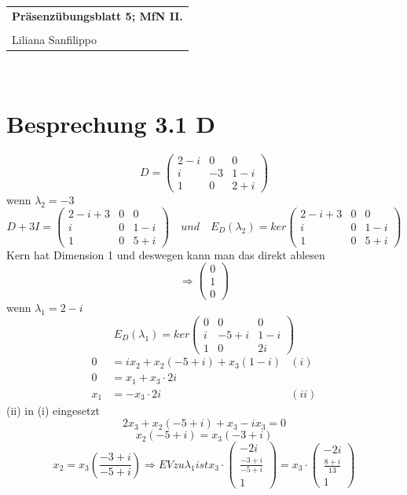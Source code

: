 \documentclass{article} %
\newcommand{\titulo}{Präsenzübungsblatt 5; MfN II.}
\newcommand{\nombre}{Liliana Sanfilippo}
\begin{document}
\begin{tabular}{p{12cm}}
{{\Large\bf\titulo}}\\
\vspace{0.2cm}\\
 {\large\nombre}\\
\end{tabular}
\vspace{0.2cm}\\
\section*{Besprechung 3.1 D}
\[
D = \begin{pmatrix}
2-i&0&0\\
i&-3&1-i\\
1&0&2+i
\end{pmatrix}
\]
wenn $\lambda_2 = -3$
\[
D+3I = \begin{pmatrix}
2-i+3&0&0\\
i&0&1-i\\
1&0&5+i
\end{pmatrix} \quad und \quad
E_D(\lambda_2) = ker \begin{pmatrix}
2-i+3&0&0\\
i&0&1-i\\
1&0&5+i
\end{pmatrix}
\]
Kern hat Dimension 1 und deswegen kann man das direkt ablesen 
\[
\Rightarrow \begin{pmatrix}
0 \\ 1 \\ 0
\end{pmatrix}
\]
wenn $\lambda_1 = 2-i$
\[
E_D(\lambda_1) = ker\begin{pmatrix}
0&0&0\\
i&-5+i&1-i\\
1&0&2i
\end{pmatrix} 
\]
\begin{align*}
    0 & = ix_2 + x_2 (-5 + i) + x_3 (1-i) & (i)\\
    0 & = x_1 + x_3 \cdot 2i  \\
    x_1 & = -x_3 \cdot 2i & (ii) 
\end{align*}
(ii) in (i) eingesetzt 
\[
2 x_3 + x_2 (-5 +i) + x_3 - i x_3 = 0
\]
\[x_2 (-5 +i) = x_3 (-3 +i) \]
\[x_2 = x_3 (\frac{-3+i}{-5+i}) \Rightarrow EV zu \lambda_1 ist x_3 \cdot \begin{pmatrix} -2i \\ \frac{-3+i}{-5+i} \\ 1 
\end{pmatrix} = x_3 \cdot \begin{pmatrix} -2i \\ \frac{8+i}{13} \\ 1 
\end{pmatrix}
\]
\end{document}
